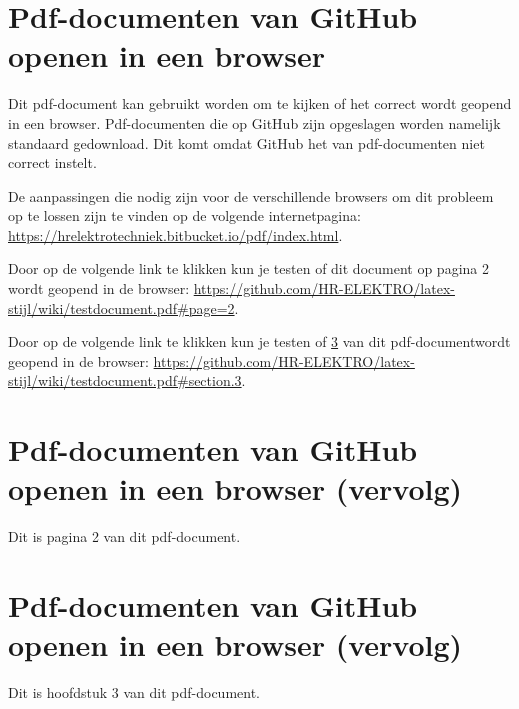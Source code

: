 \newcommand{\myClass}{article}

\newcommand{\forceOneSided}{}




\section{Pdf-documenten van GitHub openen in een browser}

Dit pdf-document kan gebruikt worden om te kijken of het correct wordt geopend in een browser.
Pdf-documenten die op GitHub zijn opgeslagen worden namelijk standaard gedownload.
Dit komt omdat GitHub het  van pdf-documenten niet correct instelt.

De aanpassingen die nodig zijn voor de verschillende browsers om dit probleem op te lossen zijn te vinden op de volgende internetpagina:
\url{https://hrelektrotechniek.bitbucket.io/pdf/index.html}.

Door op de volgende link te klikken kun je testen of dit document op pagina 2 wordt geopend in de browser:
\url{https://github.com/HR-ELEKTRO/latex-stijl/wiki/testdocument.pdf#page=2}.

Door op de volgende link te klikken kun je testen of \cref{section} van dit pdf-documentwordt geopend in de browser:
\url{https://github.com/HR-ELEKTRO/latex-stijl/wiki/testdocument.pdf#section.3}.

\newpage{}
\section{Pdf-documenten van GitHub openen in een browser (vervolg)}
Dit is pagina 2 van dit pdf-document.

\newpage{}
\section{Pdf-documenten van GitHub openen in een browser (vervolg)}
\label{section}
Dit is hoofdstuk 3 van dit pdf-document.

